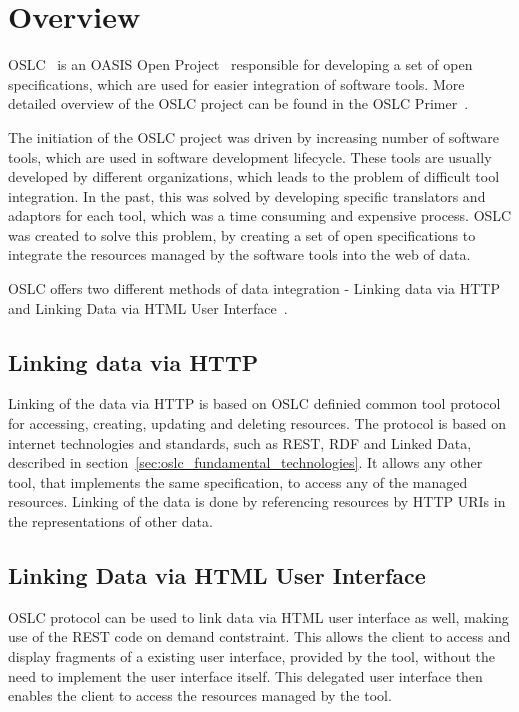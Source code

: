 \section{Overview}
OSLC \cite{oslc} is an OASIS Open Project \cite{oasis_open} responsible for developing a set of open specifications, which are used for easier integration of software tools. More detailed overview of the OSLC project can be found in the OSLC Primer \cite{oslc_primer}.

The initiation of the OSLC project was driven by increasing number of software tools, which are used in software development lifecycle. These tools are usually developed by different organizations, which leads to the problem of difficult tool integration. In the past, this was solved by developing specific translators and adaptors for each tool, which was a time consuming and expensive process. OSLC was created to solve this problem, by creating a set of open specifications to integrate the resources managed by the software tools into the web of data.

OSLC offers two different methods of data integration - Linking data via HTTP and Linking Data via HTML User Interface \cite{oslc_primary_integration_techniques}.

\subsection*{Linking data via HTTP}
Linking of the data via HTTP is based on OSLC definied common tool protocol for accessing, creating, updating and deleting resources. The protocol is based on internet technologies and standards, such as REST, RDF and Linked Data, described in section \ref{sec:oslc_fundamental_technologies}. It allows any other tool, that implements the same specification, to access any of the managed resources. Linking of the data is done by referencing resources by HTTP URIs in the representations of other data.

\subsection*{Linking Data via HTML User Interface}
\label {sec:oslc_linking_data_via_html_user_interface}
OSLC protocol can be used to link data via HTML user interface as well, making use of the REST code on demand contstraint. This allows the client to access and display fragments of a existing user interface, provided by the tool, without the need to implement the user interface itself. This delegated user interface then enables the client to access the resources managed by the tool.

